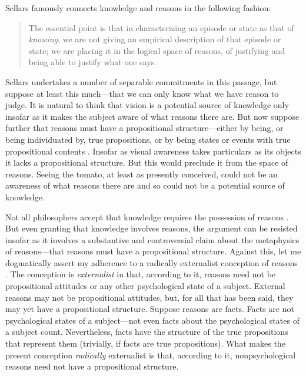 \documentclass[12pt]{article}
\begin{document}
Sellars famously connects knowledge and reasons in the following fashion:
\begin{quote}
	The essential point is that in characterizing an episode or state as that of \emph{knowing}, we are not giving an empirical description of that episode or state; we are placing it in the logical space of reasons, of justifying and being able to justify what one says. \citep[§36]{Sellars:1956xp}
\end{quote}
Sellars undertakes a number of separable commitments in this passage, but suppose at least this much---that we can only know what we have reason to judge. It is natural to think that vision is a potential source of knowledge only insofar as it makes the subject aware of what reasons there are. But now suppose further that reasons must have a propositional structure---either by being, or being individuated by, true propositions, or by being states or events with true propositional contents \citep[see][141, 143--4]{McDowell:1996uq}. Insofar as visual awareness takes particulars as its objects it lacks a propositional structure. But this would preclude it from the space of reasons. Seeing the tomato, at least as presently conceived, could not be an awareness of what reasons there are and so could not be a potential source of knowledge.

Not all philosophers accept that knowledge requires the possession of reasons \citep[see][for a recent expression of skepticism]{Pryor:2007fk}. But even granting that knowledge involves reasons, the argument can be resisted insofar as it involves a substantive and controversial claim about the metaphysics of reasons---that reasons must have a propositional structure. Against this, let me dogmatically assert my adherence to a radically externalist conception of reasons \citep[see][]{Scanlon:1998hb,Raz:2000tm}. The conception is \emph{externalist} in that, according to it, reasons need not be propositional attitudes or any other psychological state of a subject. External reasons may not be propositional attitudes, but, for all that has been said, they may yet have a propositional structure. Suppose reasons are facts. Facts are not psychological states of a subject---not even facts about the psychological states of a subject count. Nevertheless, facts have the structure of the true propositions that represent them (trivially, if facts are true propositions). What makes the present conception \emph{radically} externalist is that, according to it, nonpsychological reasons need not have a propositional structure.
\end{document}
